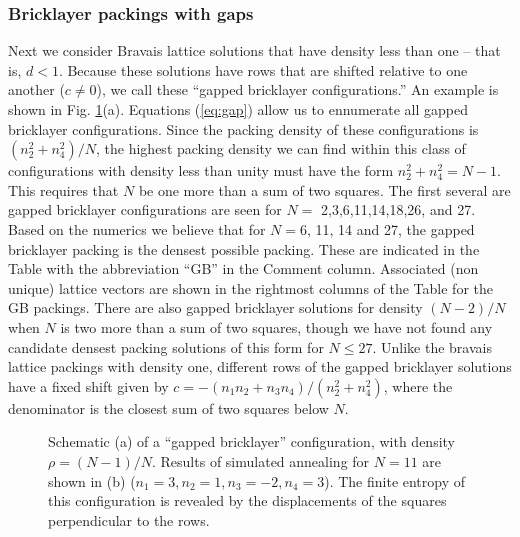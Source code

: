 \documentclass[preprint,aps]{revtex4}
\begin{document}

\subsubsection{Bricklayer packings with gaps}
\label{sec:bricklayer}
Next we consider Bravais lattice solutions that have density less than one -- that is, $d < 1$.  Because these solutions have rows that are shifted relative to one another ($c\neq 0$), we call these ``gapped bricklayer configurations.''  An example is shown in Fig. \ref{fig:gb}(a).  Equations (\ref{eq:gap}) allow us to ennumerate all gapped bricklayer configurations. Since the packing density of these configurations is $(n_2^2 + n_4^2)/N$, the highest packing density we can find within this class of configurations with density less than unity must have the form $n_2^2 + n_4^2 = N-1$.  This requires that $N$ be one more than a sum of two squares. The first several are gapped bricklayer configurations are seen for $N=$ 2,3,6,11,14,18,26, and 27.  Based on the numerics we believe that for $N=6$, 11, 14 and 27, the gapped bricklayer packing is the densest possible packing. These are indicated in the Table with the abbreviation ``GB'' in the Comment column. Associated (non unique) lattice vectors are shown in the rightmost columns of the Table for the GB packings.  There are also gapped bricklayer solutions for density $(N-2)/N$ when $N$ is two more than a sum of two squares, though we have not found any candidate densest packing solutions of this form for $N \leq 27$. Unlike the bravais lattice packings with density one, different rows of the gapped bricklayer solutions have a fixed shift given by $c = - (n_1 n_2 + n_3 n_4)/(n_2^2 + n_4^2)$, where the denominator is the closest sum of two squares below $N$. 

\begin{figure}[H]
\caption{\label{fig:gb}Schematic (a) of a ``gapped bricklayer'' configuration, with density $\rho = (N-1)/N$. Results of simulated annealing for $N=11$ are shown in (b) ($n_1=3, n_2=1, n_3=-2, n_4=3$).  The finite entropy of this configuration is revealed by the displacements of the squares perpendicular to the rows.}
\end{figure}
\end{document}
